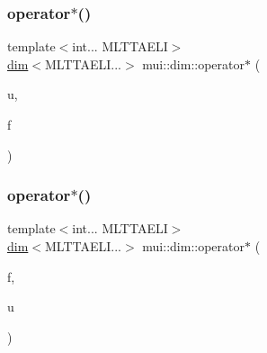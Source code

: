 \mbox{\label{namespacemui_1_1dim_a907ada47c6d390dc77c6b3b23f94aae9}} 
\subsubsection{\texorpdfstring{operator$\ast$()}{operator*()}\hspace{0.1cm}{\footnotesize\ttfamily [3/4]}}
{\footnotesize\ttfamily template$<$int... M\+L\+T\+T\+A\+E\+LI$>$ \\
\hyperlink{structmui_1_1dim_1_1dim}{dim}$<$M\+L\+T\+T\+A\+E\+L\+I...$>$ mui\+::dim\+::operator$\ast$ (\begin{DoxyParamCaption}\item[{const \hyperlink{structmui_1_1dim_1_1dim}{dim}$<$ M\+L\+T\+T\+A\+E\+L\+I... $>$ \&}]{u,  }\item[{const double}]{f }\end{DoxyParamCaption})\hspace{0.3cm}{\ttfamily [inline]}}

\mbox{\label{namespacemui_1_1dim_a98f23ba6e8e53e2d0997d7c01bd81d17}} 
\subsubsection{\texorpdfstring{operator$\ast$()}{operator*()}\hspace{0.1cm}{\footnotesize\ttfamily [4/4]}}
{\footnotesize\ttfamily template$<$int... M\+L\+T\+T\+A\+E\+LI$>$ \\
\hyperlink{structmui_1_1dim_1_1dim}{dim}$<$M\+L\+T\+T\+A\+E\+L\+I...$>$ mui\+::dim\+::operator$\ast$ (\begin{DoxyParamCaption}\item[{const double}]{f,  }\item[{const \hyperlink{structmui_1_1dim_1_1dim}{dim}$<$ M\+L\+T\+T\+A\+E\+L\+I... $>$ \&}]{u }\end{DoxyParamCaption})\hspace{0.3cm}{\ttfamily [inline]}}

\mbox{\label{namespacemui_1_1dim_a3f4c4c80924f6f8f409a0c80894e15a2}} 
